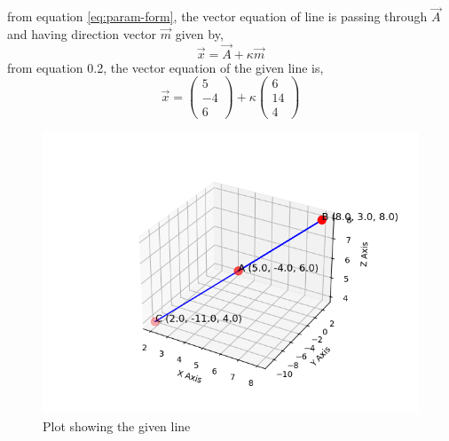\documentclass[journal]{IEEEtran}
\begin{document}
from equation \eqref{eq:param-form}, the vector equation of line is passing through $\vec{A}$ and having direction vector $\vec{m}$ given by,\\
\begin{equation}
    \vec{x}=\vec{A}+\kappa\vec{m}
\end{equation}
from  equation 0.2, the vector equation of the given line is,
\begin{equation*}
    \vec{x}=\begin{pmatrix}
        5\\
        -4\\
        6
    \end{pmatrix}+\kappa\begin{pmatrix}
        6\\
        14\\
        4
    \end{pmatrix}
\end{equation*}

 \begin{figure}[h!]
   \centering
   \includegraphics[width=0.7\linewidth]{figs/figure1.png}
   \caption{Plot showing the given line}
   \label{stemplot}
\end{figure}
\end{document}
